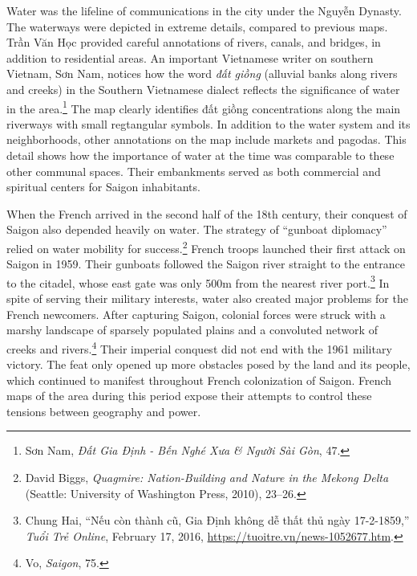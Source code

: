 Water was the lifeline of communications in the city under the Nguyễn Dynasty. The waterways were depicted in extreme details, compared to previous maps. Trần Văn Học provided careful annotations of rivers, canals, and bridges, in addition to residential areas. An important Vietnamese writer on southern Vietnam, Sơn Nam, notices how the word \textit{đất giồng} (alluvial banks along rivers and creeks) in the Southern Vietnamese dialect reflects the significance of water in the area.\footnote{Sơn Nam, \textit{Đất Gia Định - Bến Nghé Xưa \& Người Sài Gòn}, 47.} The map clearly identifies đất giồng concentrations along the main riverways with small regtangular symbols. In addition to the water system and its neighborhoods, other annotations on the map include markets and pagodas. This detail shows how the importance of water at the time was comparable to these other communal spaces. Their embankments served as both commercial and spiritual centers for Saigon inhabitants.

When the French arrived in the second half of the 18th century, their conquest of Saigon also depended heavily on water. The strategy of “gunboat diplomacy” relied on water mobility for success.\footnote{David Biggs, \textit{Quagmire: Nation-Building and Nature in the Mekong Delta} (Seattle: University of Washington Press, 2010), 23–26.} French troops launched their first attack on Saigon in 1959. Their gunboats followed the Saigon river straight to the entrance to the citadel, whose east gate was only 500m from the nearest river port.\footnote{Chung Hai, “Nếu còn thành cũ, Gia Định không dễ thất thủ ngày 17-2-1859,” \textit{Tuổi Trẻ Online}, February 17, 2016, \url{https://tuoitre.vn/news-1052677.htm}.} In spite of serving their military interests, water also created major problems for the French newcomers. After capturing Saigon, colonial forces were struck with a marshy landscape of sparsely populated plains and a convoluted network of creeks and rivers.\footnote{Vo, \textit{Saigon}, 75.} Their imperial conquest did not end with the 1961 military victory. The feat only opened up more obstacles posed by the land and its people, which continued to manifest throughout French colonization of Saigon. French maps of the area during this period expose their attempts to control these tensions between geography and power.

